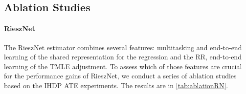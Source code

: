 \documentclass[nohyperref]{article}
\theoremstyle{plain}
\theoremstyle{definition}
\theoremstyle{remark}
\begin{document}
\subsection{Ablation Studies}
\begin{table}[!tp]
    \centering
    \caption{IHDP ablation studies for RieszNet. Row 2 uses no multitasking, the Riesz representer and regression function are estimated using separate NNs. Row 3 removes ``end-to-end'' training of the shared representation: the weights of the common layers are trained on the Riesz loss only, then frozen when optimizing the regression loss. Row 4 removes ``end-to-end'' learning of the TMLE adjustment: we set $\lambda_2 = 0$ and then adjust the outputs of RieszNet in a standard TMLE post-processing step.}
    \label{tab:ablationRN}
    \vspace{1em}
    
\end{table}

\begin{table}[!tp]
    \centering
    \caption{BHP ablation studies for ForestRiesz. Row 2 uses no cross-fitting and no multitasking. Row 3 uses no cross-fitting and multitasking. Row 4 uses simple cross-fitting and no multitasking. Row 5 uses double cross-fitting.}
    \label{tab:ablationFR}
    \vspace{1em}
    \resizebox{\textwidth}{!}{\footnotesize}
\end{table}

\paragraph{RieszNet} The RieszNet estimator combines several features: multitasking and end-to-end learning of the shared representation for the regression and the RR, end-to-end learning of the TMLE adjustment. To assess which of those features are crucial for the performance gains of RieszNet, we conduct a series of ablation studies based on the IHDP ATE experiments. The results are in \cref{tab:ablationRN}.
\end{document}
